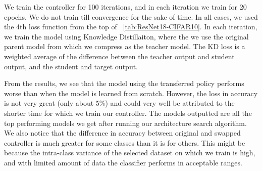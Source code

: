 \documentclass[../main]{subfiles}
\begin{document}
        We train the controller for 100 iterations, and in each iteration we train for 20 epochs.
        We do not train till convergence for the sake of time. In all cases, we used the 4th loss function from the top of \tablename~\ref{tab:ResNet18-CIFAR10}. %
        In each iteration, we train the model using Knowledge Distillaiton, where the we use the original parent model from which we compress as the teacher model.
        The KD loss is a weighted average of the difference between the teacher output and student output, and the student and target output.

        
        
        
        From the results, we see that the model using the transferred policy performs worse than when the model is learned from scratch.
        However, the loss in accuracy is not very great (only about 5\%) and could very well be attributed to the shorter time for which we train our controller.
        The models outputted are all the top performing models we get after running our architecture search algorithm.
        We also notice that the difference in accuracy between original and swapped controller is much greater for some classes than it is for others.
        This might be because the intra-class variance of the selected dataset on which we train is high, and with limited amount of data the classifier performs in acceptable ranges. 

\end{document}
